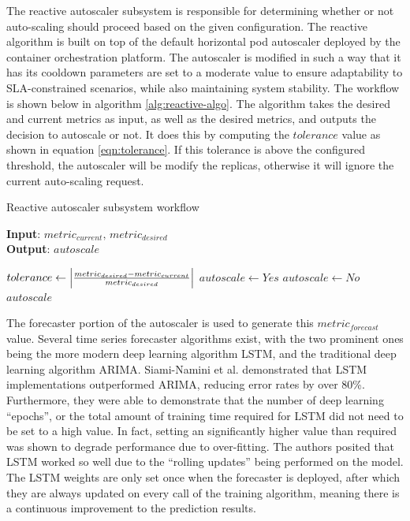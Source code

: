 The reactive autoscaler subsystem is responsible for determining whether or not auto-scaling should proceed based on the given configuration. The reactive algorithm is built on top of the default horizontal pod autoscaler deployed by the container orchestration platform. The autoscaler is modified in such a way that it has its cooldown parameters are set to a moderate value to ensure adaptability to SLA-constrained scenarios, while also maintaining system stability. The workflow is shown below in algorithm \ref{alg:reactive-algo}. The algorithm takes the desired and current metrics as input, as well as the desired metrics, and outputs the decision to autoscale or not. It does this by computing the $tolerance$ value as shown in equation \ref{eqn:tolerance}. If this tolerance is above the configured threshold, the autoscaler will be modify the replicas, otherwise it will ignore the current auto-scaling request.\par

\begin{algorithm}
    \caption{Reactive autoscaler subsystem workflow}
    \label{alg:reactive-algo}
    \textbf{Input}: $metric_{current},\, metric_{desired}$\\
    \textbf{Output}: $autoscale$
    \begin{algorithmic}
        \State $tolerance \gets \abs{ \frac{metric_{desired} - metric_{current}}{metric_{desired}} }$
            \State $autoscale \gets Yes$
        \Else
            \State $autoscale \gets No$
        \EndIf
        \State \Return $autoscale$
    \end{algorithmic}
\end{algorithm}

The forecaster portion of the autoscaler is used to generate this $metric_{forecast}$ value. Several time series forecaster algorithms exist, with the two prominent ones being the more modern deep learning algorithm LSTM, and the traditional deep learning algorithm ARIMA. Siami-Namini et al. \cite{siami2018comparison} demonstrated that LSTM implementations outperformed ARIMA, reducing error rates by over 80\%. Furthermore, they were able to demonstrate that the number of deep learning ``epochs'', or the total amount of training time required for LSTM did not need to be set to a high value. In fact, setting an significantly higher value than required was shown to degrade performance due to over-fitting. The authors posited that LSTM worked so well due to the ``rolling updates'' being performed on the model. The LSTM weights are only set once when the forecaster is deployed, after which they are always updated on every call of the training algorithm, meaning there is a continuous improvement to the prediction results.\par

